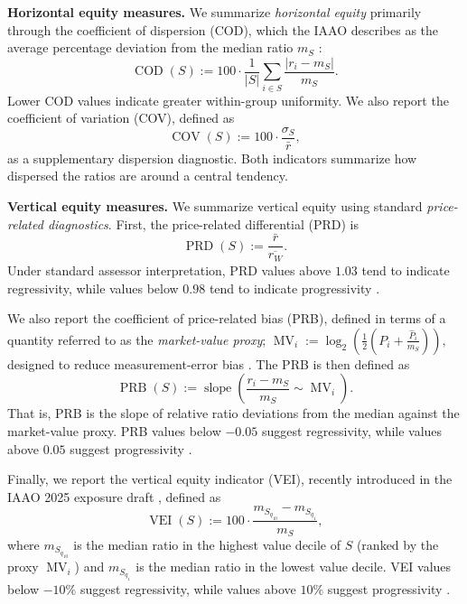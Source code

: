 \documentclass[12pt]{article}
\theoremstyle{plain}
\theoremstyle{definition}
\newcommand{\1}{\mathbf{1}}
\begin{document}
\medskip
\noindent\textbf{Horizontal equity measures.}
We summarize \textit{horizontal equity} primarily through the coefficient of dispersion (COD), which the IAAO describes as the average percentage deviation from the median ratio $m_S$ \cite{IAAO2013Ratio,IAAO2025ExposureRatio}:
\begin{equation}
\label{eq:cod}
\operatorname{COD}(S)
:=
100\cdot\frac{1}{|S|}
\sum_{i\in S}\frac{|r_i-m_S|}{m_S}.
\end{equation}
Lower COD values indicate greater within-group uniformity. We also report the coefficient of variation (COV), defined as
\begin{equation}
\label{eq:cov_metric}
\operatorname{COV}(S)
:=
100\cdot\frac{\sigma_S}{\bar r},
\end{equation}
as a supplementary dispersion diagnostic. Both indicators summarize how dispersed the ratios are around a central tendency.

\medskip
\noindent\textbf{Vertical equity measures.}
We summarize vertical equity using standard \textit{price-related diagnostics}. First, the price-related differential (PRD) is
\begin{equation}
\label{eq:prd}
\operatorname{PRD}(S)
:=
\frac{\bar r}{\overline{r_W}}.
\end{equation}
Under standard assessor interpretation, PRD values above $1.03$ tend to indicate regressivity, while values below $0.98$ tend to indicate progressivity \cite{IAAO2013Ratio,IAAO2025ExposureRatio}.

We also report the coefficient of price-related bias (PRB), defined in terms of a quantity referred to as the \textit{market-value proxy}; \cite{IAAO2025ExposureRatio}
$
\operatorname{MV}_i
:=
\log_2\!\left(\frac{1}{2}\left(P_i+\frac{\widehat P_i}{m_S}\right)\right),
$
designed to reduce measurement-error bias \cite{IAAO2025ExposureRatio}. The PRB is then defined as
\begin{equation}
\label{eq:prb}
\operatorname{PRB}(S)
:=
\operatorname{slope}\!\left(\frac{r_i-m_S}{m_S}\sim \operatorname{MV}_i\right).
\end{equation}
That is, PRB is the slope of relative ratio deviations from the median against the market-value proxy. PRB values below $-0.05$ suggest regressivity, while values above $0.05$ suggest progressivity \cite{IAAO2013Ratio,IAAO2025ExposureRatio}.

Finally, we report the vertical equity indicator (VEI), recently introduced in the IAAO 2025 exposure draft \cite{IAAO2025ExposureRatio}, defined as
\begin{equation}
\label{eq:vei}
\operatorname{VEI}(S)
:=
100\cdot\frac{m_{S_{q_{10}}}-m_{S_{q_1}}}{m_S},
\end{equation}
where $m_{S_{q_{10}}}$ is the median ratio in the highest value decile of $S$ (ranked by the proxy $\operatorname{MV}_i$) and $m_{S_{q_1}}$ is the median ratio in the lowest value decile. VEI values below $-10\%$ suggest regressivity, while values above $10\%$ suggest progressivity \cite{IAAO2025ExposureRatio}.
\end{document}

